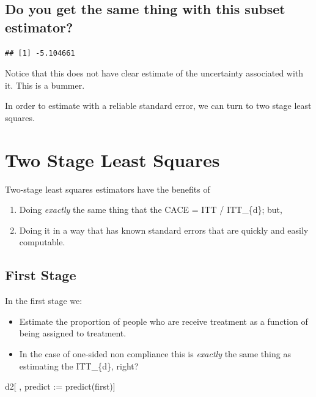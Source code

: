 \documentclass[
]{book}
\providecommand{\tightlist}{%
  \setlength{\itemsep}{0pt}\setlength{\parskip}{0pt}}
\begin{document}
\hypertarget{do-you-get-the-same-thing-with-this-subset-estimator}{%
\subsection{Do you get the same thing with this subset
estimator?}\label{do-you-get-the-same-thing-with-this-subset-estimator}}

\begin{verbatim}
## [1] -5.104661
\end{verbatim}

Notice that this does not have clear estimate of the uncertainty
associated with it. This is a bummer.

In order to estimate with a reliable standard error, we can turn to two
stage least squares.

\hypertarget{two-stage-least-squares}{%
\section{Two Stage Least Squares}\label{two-stage-least-squares}}

Two-stage least squares estimators have the benefits of

\begin{enumerate}
\def\labelenumi{\arabic{enumi}.}
\tightlist
\item
  Doing \emph{exactly} the same thing that the CACE = ITT / ITT\_\{d\};
  but,
\item
  Doing it in a way that has known standard errors that are quickly and
  easily computable.
\end{enumerate}

\hypertarget{first-stage}{%
\subsection{First Stage}\label{first-stage}}

In the first stage we:

\begin{itemize}
\tightlist
\item
  Estimate the proportion of people who are receive treatment as a
  function of being assigned to treatment.
\item
  In the case of one-sided non compliance this is \emph{exactly} the
  same thing as estimating the ITT\_\{d\}, right?
\end{itemize}

d2{[} , predict := predict(first){]}
\end{document}
